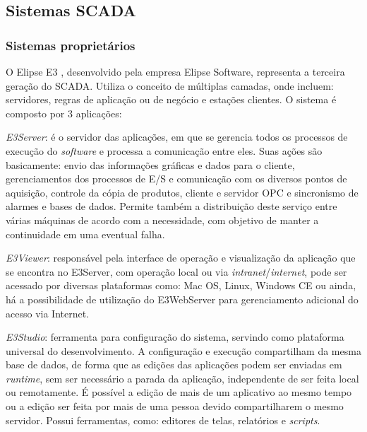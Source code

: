     \subsection{Sistemas SCADA}
    \label{sec:sistemas-scada}
    
    \subsubsection{Sistemas proprietários}
    \label{sec:sistemas-scada-proprietarios}
    
    \label{sec:elipse}

        O Elipse E3 \cite{Elipse}, desenvolvido pela empresa Elipse Software, representa a terceira geração do \gls{SCADA}. Utiliza o conceito de múltiplas camadas, onde incluem: servidores, regras de aplicação ou de negócio e estações clientes. O sistema é composto por 3 aplicações: 
        
        \begin{alineascomponto}
        	\item \textit{E3Server}: é o servidor das aplicações, em que se gerencia todos os processos de execução do \textit{software} e processa a comunicação entre eles. Suas ações são basicamente: envio das informações gráficas e dados para o cliente, gerenciamentos dos processos de E/S e comunicação com os diversos pontos de aquisição, controle da cópia de produtos, cliente e servidor OPC e sincronismo de alarmes e bases de dados. Permite também a distribuição deste serviço entre várias máquinas de acordo com a necessidade, com objetivo de manter a continuidade em uma eventual falha.
        	\item \textit{E3Viewer}: responsável pela interface de operação e visualização da aplicação que se encontra no E3Server, com operação local ou via \textit{intranet}/\textit{internet}, pode ser acessado por diversas plataformas como: Mac OS, Linux, Windows CE ou ainda, há a possibilidade de utilização do E3WebServer para gerenciamento adicional do acesso via Internet.
        	\item \textit{E3Studio}: ferramenta para configuração do sistema, servindo como plataforma universal do desenvolvimento. A configuração e execução compartilham da mesma base de dados, de forma que as edições das aplicações podem ser enviadas em \textit{runtime}, sem ser necessário a parada da aplicação, independente de ser feita local ou remotamente. É possível a edição de mais de um aplicativo ao mesmo tempo ou a edição ser feita por mais de uma pessoa devido compartilharem o mesmo servidor. Possui ferramentas, como: editores de telas, relatórios e \textit{scripts}.
        \end{alineascomponto}
        
